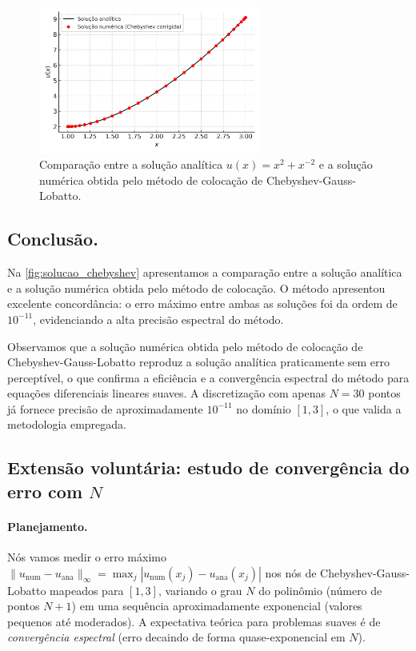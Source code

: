 \documentclass[11pt,a4paper]{article}
\begin{document}
\begin{figure}
    \centering
    \includegraphics[width=0.65\textwidth]{figures/fig_solucao_chebyshev.png}
    \caption{Comparação entre a solução analítica $u(x)=x^{2}+x^{-2}$ e a solução numérica obtida pelo método de colocação de Chebyshev-Gauss-Lobatto.}
    \label{fig:solucao_chebyshev}
\end{figure}

\subsection{Conclusão.}

Na \autoref{fig:solucao_chebyshev} apresentamos a comparação entre a solução analítica e a solução numérica obtida pelo método de colocação.  
O método apresentou excelente concordância: o erro máximo entre ambas as soluções foi da ordem de $10^{-11}$, evidenciando a alta precisão espectral do método.

Observamos que a solução numérica obtida pelo método de colocação de Chebyshev-Gauss-Lobatto reproduz a solução analítica praticamente sem erro perceptível, o que confirma a eficiência e a convergência espectral do método para equações diferenciais lineares suaves.  
A discretização com apenas $N=30$ pontos já fornece precisão de aproximadamente $10^{-11}$ no domínio $[1,3]$, o que valida a metodologia empregada.

\subsection{Extensão voluntária: estudo de convergência do erro com $N$}

\paragraph{Planejamento.}
Nós vamos medir o erro máximo 
$\|u_{\text{num}}-u_{\text{ana}}\|_{\infty}
=\max_j |u_{\text{num}}(x_j)-u_{\text{ana}}(x_j)|$
nos nós de Chebyshev-Gauss-Lobatto mapeados para $[1,3]$, variando o grau $N$ do polinômio (número de pontos $N{+}1$) em uma sequência aproximadamente exponencial (valores pequenos até moderados). A expectativa teórica para problemas suaves é de \emph{convergência espectral} (erro decaindo de forma quase-exponencial em $N$).
\end{document}
